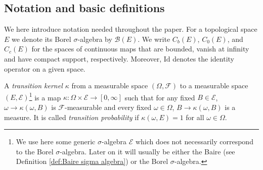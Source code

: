 \documentclass[a4paper,12pt]{article}
\theoremstyle{definition}
\theoremstyle{remark}
\numberwithin{equation}{section}
\numberwithin{theorem}{section}
\begin{document}
\subsection{Notation and basic definitions}

We here introduce notation needed throughout the paper.
For a topological space $E$ we denote its  Borel $\sigma$-algebra  by $\mathcal{B}(E)$. We write $C_{b}(E)$, $C_{0}(E)$, and $C_{c}(E)$  for the spaces of continuous maps that are bounded, vanish at infinity and have compact support, respectively. Moreover,  $\text{Id}$  denotes the identity operator on a given space. 

A \emph{transition kernel $\kappa$}  from a measurable space $\left(\Omega,\mathcal{F}\right)$ to a measurable space $\left(E,\mathcal{\mathcal{E}}\right)$\footnote{We use here some generic $\sigma$-algebra $\mathcal{E}$ which does not necessarily correspond to the Borel $\sigma$-algebra. Later on it will usually be either the Baire 
(see Definition \ref{def:Baire sigma algebra}) or the Borel $\sigma$-algebra.} is a map $\kappa: \Omega \times \mathcal{E} \to [0,\infty]$ such that for any fixed $B \in \mathcal{E}$, $\omega \to \kappa(\omega, B)$ is $\mathcal{F}$-measurable
and  every fixed $\omega \in \Omega$, $B \to \kappa(\omega, B)$ is a measure. It is called \emph{transition probability} if $\kappa(\omega, E)=1$ for all $\omega \in \Omega$.
\end{document}
